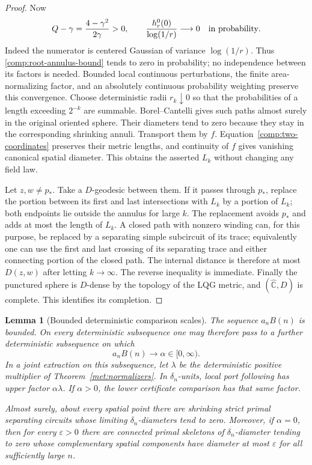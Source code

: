 \documentclass[11pt]{article}
\numberwithin{equation}{section}
\newtheorem{lemma}[theorem]{Lemma}
\theoremstyle{definition}
\theoremstyle{remark}
\newcommand{\Chat}{\widehat{\mathbb C}}
\newcommand{\1}{\mathbf 1}
\begin{document}
\begin{proof}
Now
\[
 Q-\gamma=\frac{4-\gamma^2}{2\gamma}>0,
 \qquad
 \frac{h^0_r(0)}{\log(1/r)}\longrightarrow0
 \quad\hbox{in probability}.
\]
Indeed the numerator is centered Gaussian of variance
$\log(1/r)$.  Thus \eqref{comp:root-annulus-bound} tends to zero in
probability; no independence between its factors is needed.  Bounded
local continuous perturbations, the finite area-normalizing factor,
and an absolutely continuous probability weighting preserve this
convergence.  Choose deterministic radii $r_k\downarrow0$ so that
the probabilities of a length exceeding $2^{-k}$ are summable.
Borel--Cantelli gives such paths almost surely in the original
oriented sphere.  Their diameters tend to zero because they stay
in the corresponding shrinking annuli.  Transport them by $f$.
Equation~\eqref{comp:two-coordinates} preserves their metric lengths,
and continuity of $f$ gives vanishing canonical spatial diameter.
This obtains the asserted $L_k$ without changing any field law.

Let $z,w\ne p_*$.  Take a $D$-geodesic between them.  If it passes
through $p_*$, replace the portion between its first and last
intersections with $L_k$ by a portion of $L_k$; both endpoints lie
outside the annulus for large $k$.  The replacement avoids $p_*$ and
adds at most the length of $L_k$.  A closed path with nonzero winding
can, for this purpose, be replaced by a separating simple subcircuit
of its trace; equivalently one can use the first and last crossing
of its separating trace and either connecting portion of the closed
path.  The internal distance is therefore at most $D(z,w)$ after
letting $k\to\infty$.  The reverse inequality is immediate.
Finally the punctured sphere is $D$-dense by the topology of the LQG
metric, and $(\Chat,D)$ is complete.  This identifies its completion.
\end{proof}

\begin{lemma}[Bounded deterministic comparison scales]
\label{comp:scales}
The sequence $a_nB(n)$ is bounded.  On every deterministic subsequence
one may therefore pass to a further deterministic subsequence on
which
\begin{equation}
 \label{comp:alpha}
 a_nB(n)\longrightarrow\alpha\in[0,\infty).
\end{equation}
In a joint extraction on this subsequence, let $\lambda$ be the
deterministic positive multiplier of
Theorem~\ref{met:normalizers}.  In $\delta_n$-units, local port
following has upper factor $\alpha\lambda$.  If $\alpha>0$, the
lower certificate comparison has that same factor.

Almost surely, about every spatial point there are shrinking strict
primal separating circuits whose limiting $\delta_n$-diameters tend
to zero.  Moreover, if $\alpha=0$, then for every $\varepsilon>0$
there are connected primal skeletons of $\delta_n$-diameter tending
to zero whose complementary spatial components have diameter at
most $\varepsilon$ for all sufficiently large $n$.
\end{lemma}
\end{document}
